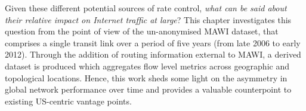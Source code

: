 Given these different potential sources of rate control, \emph{what can be said about their relative impact on Internet traffic at large}?
This chapter investigates this question from the point of view of the un-anonymised \acs{MAWI} dataset, that comprises a single transit link over a period of five years (from late 2006 to early 2012). 
Through the addition of routing information external to \acs{MAWI}, a derived dataset is produced which aggregates flow level metrics across geographic and topological locations. 
Hence, this work sheds some light on the asymmetry in global network performance over time and provides a valuable counterpoint to existing US-centric vantage points.


